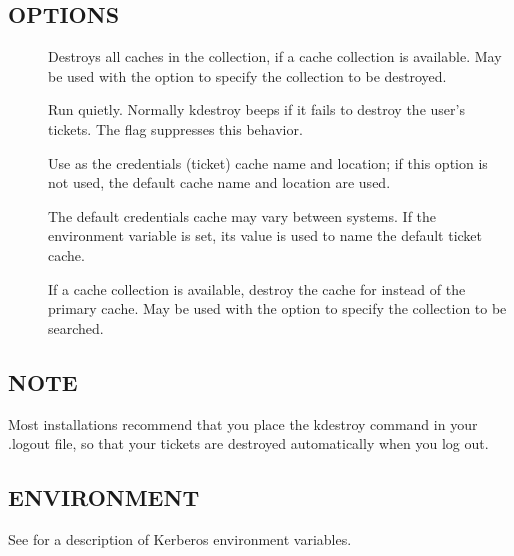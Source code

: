 \documentclass[letterpaper,10pt,english]{sphinxmanual}
\begin{document}
\subsection{OPTIONS}
\label{\detokenize{user/user_commands/kdestroy:options}}\begin{description}
\item[{}] \leavevmode
\sphinxAtStartPar
Destroys all caches in the collection, if a cache collection is
available.  May be used with the  option to specify the
collection to be destroyed.

\item[{}] \leavevmode
\sphinxAtStartPar
Run quietly.  Normally kdestroy beeps if it fails to destroy the
user’s tickets.  The  flag suppresses this behavior.

\item[{ }] \leavevmode
\sphinxAtStartPar
Use  as the credentials (ticket) cache name and
location; if this option is not used, the default cache name and
location are used.

\sphinxAtStartPar
The default credentials cache may vary between systems.  If the
 environment variable is set, its value is used to
name the default ticket cache.

\item[{ }] \leavevmode
\sphinxAtStartPar
If a cache collection is available, destroy the cache for
 instead of the primary cache.  May be used with the
 option to specify the collection to be searched.

\end{description}


\subsection{NOTE}
\label{\detokenize{user/user_commands/kdestroy:note}}
\sphinxAtStartPar
Most installations recommend that you place the kdestroy command in
your .logout file, so that your tickets are destroyed automatically
when you log out.


\subsection{ENVIRONMENT}
\label{\detokenize{user/user_commands/kdestroy:environment}}
\sphinxAtStartPar
See {\hyperref[\detokenize{user/user_config/kerberos:kerberos-7}]{}} for a description of Kerberos environment
variables.
\end{document}
